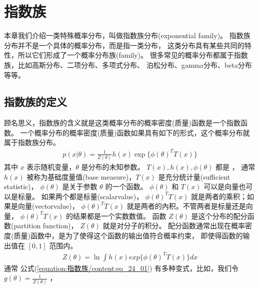 \documentclass[letterpaper,10pt,english]{sphinxmanual}
\begin{document}
\chapter{指数族}
\label{\detokenize{_u6307_u6570_u65cf/content:id1}}\label{\detokenize{_u6307_u6570_u65cf/content::doc}}
本章我们介绍一类特殊概率分布，叫做指数族分布(exponential family)。
指数族分布并不是一个具体的概率分布，而是指一类分布，
这类分布具有某些共同的特性，所以它们形成了一个概率分布族(family)。
很多常见的概率分布都属于指数族，比如高斯分布、二项分布、多项式分布、
泊松分布、gamma分布、beta分布等等。


\section{指数族的定义}
\label{\detokenize{_u6307_u6570_u65cf/content:ch-24-1}}\label{\detokenize{_u6307_u6570_u65cf/content:id2}}
顾名思义，指数族的含义就是这类概率分布的概率密度(质量)函数是一个指数函数。
一个概率分布的概率密度(质量)函数如果具有如下的形式，这个概率分布就属于指数族分布。
\begin{equation}\label{equation:指数族/content:eq_24_01}
\begin{split}p(x|\theta) = \frac{1}{Z(\theta)} h(x) \exp \{\phi(\theta)^T T(x)  \}\end{split}
\end{equation}
其中 \(x\) 表示随机变量，\(\theta\) 是分布的未知参数。
\(T(x),h(x),\phi(\theta)\) 都是  ，
通常 \(h(x)\) 被称为基础度量值(base measure)，\(T(x)\) 是充分统计量(sufficient statistic)，
\(\phi(\theta)\) 是关于参数 \(\theta\) 的一个函数。
\(\phi(\theta)\) 和 \(T(x)\) 可以是向量也可以是标量。
如果两个都是标量(scalar\sphinxhyphen{}value)， \(\phi(\theta)^T T(x)\) 就是两者的乘积；如果是向量(vector\sphinxhyphen{}value)，
\(\phi(\theta)^T T(x)\) 就是两者的內积。不管两者是标量还是向量， \(\phi(\theta)^T T(x)\) 的结果都是一个实数数值。
函数 \(Z(\theta)\) 是这个分布的配分函数(partition function)，
\(Z(\theta)\) 就是对分子的积分。
配分函数通常出现在概率密度(质量)函数中，是为了使得这个函数的输出值符合概率约束，
即使得函数的输出值在 \([0,1]\) 范围内。
\begin{equation}\label{equation:指数族/content:eq_24_02}
\begin{split}Z(\theta) = \mathop{\ln} \int h(x) exp\{ \phi(\theta)^T T(x) \} dx\end{split}
\end{equation}
通常 公式(\ref{equation:指数族/content:eq_24_01}) 有多种变式，比如，我们令 \(g(\theta)=\frac{1}{Z(\theta)}\) ，
\end{document}
